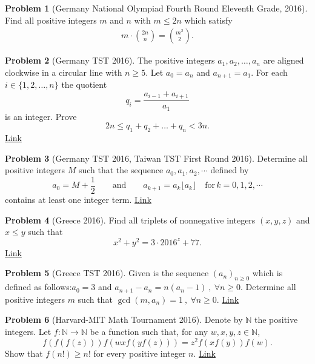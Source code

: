 \documentclass[]{article}
\theoremstyle{definition}
\newtheorem{problem}{Problem}
\begin{document}
\begin{problem}[Germany National Olympiad Fourth Round Eleventh Grade, 2016]
	Find all positive integers $m$ and $n$ with $m \leq 2n$ which satisfy
	\begin{align*}
		m \cdot \binom{2n}{n} = \binom{m^2}{2}.
	\end{align*}
\end{problem}



\begin{problem}[Germany TST 2016]
	The positive integers $a_1,a_2, \dots, a_n$ are aligned clockwise in a circular line with $n \geq 5$. Let $a_0=a_n$ and $a_{n+1}=a_1$. For each $i \in \{1,2,\dots,n \}$ the quotient \[ q_i=\frac{a_{i-1}+a_{i+1}}{a_1} \]is an integer. Prove \[ 2n \leq q_1+q_2+\dots+q_n < 3n. \] \flushright \href{http://artofproblemsolving.com/community/c6h1269699p6629923}{Link}
\end{problem}



\begin{problem}[Germany TST 2016, Taiwan TST First Round 2016]
	Determine all positive integers $M$ such that the sequence $a_0, a_1, a_2, \cdots$ defined by \[ a_0 = M + \frac{1}{2} \qquad \textrm{and} \qquad a_{k+1} = a_k\lfloor a_k \rfloor \quad \textrm{for} \, k = 0, 1, 2, \cdots \]contains at least one integer term. \hfill \href{http://artofproblemsolving.com/community/c6h1268859p6622268}{Link}
\end{problem}



\begin{problem}[Greece 2016]
	Find all triplets of nonnegative integers $(x,y,z)$ and $x\leq y$ such that
	$$x^2+y^2=3 \cdot 2016^z+77.$$
	\flushright \href{http://artofproblemsolving.com/community/c6h1205284p5947020}{Link}
\end{problem}




\begin{problem}[Greece TST 2016]
	Given is the sequence $(a_n)_{n\geq 0}$ which is defined as follows:$a_0=3$ and $a_{n+1}-a_n=n(a_n-1) \ , \ \forall n\geq 0$. Determine all positive integers $m$ such that $\gcd (m,a_n)=1 \ , \ \forall n\geq 0$. \hfill \href{http://artofproblemsolving.com/community/c6h1269148p6624948}{Link}
\end{problem}



\begin{problem}[Harvard-MIT Math Tournament 2016]
	Denote by $\mathbb{N}$ the positive integers. Let $f:\mathbb{N} \rightarrow \mathbb{N}$ be a function such that, for any $w,x,y,z \in \mathbb{N}$, \[ f(f(f(z)))f(wxf(yf(z)))=z^{2}f(xf(y))f(w). \]Show that $f(n!) \ge n!$ for every positive integer $n$. \hfill \href{http://artofproblemsolving.com/community/c6h1231859p6230953}{Link}
\end{problem}
\end{document}
